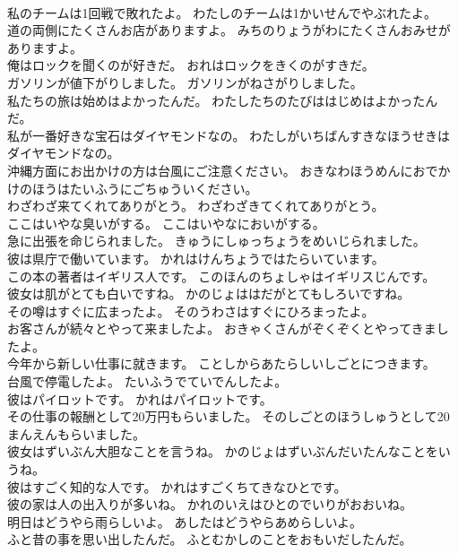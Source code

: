 \documentclass[8pt]{extreport}
\begin{document}
\begin{CJK}{UTF8}{min}
\\	私のチームは1回戦で敗れたよ。	わたしのチームは1かいせんでやぶれたよ。 
\\	道の両側にたくさんお店がありますよ。	みちのりょうがわにたくさんおみせがありますよ。 
\\	俺はロックを聞くのが好きだ。	おれはロックをきくのがすきだ。 
\\	ガソリンが値下がりしました。	ガソリンがねさがりしました。 
\\	私たちの旅は始めはよかったんだ。	わたしたちのたびははじめはよかったんだ。 
\\	私が一番好きな宝石はダイヤモンドなの。	わたしがいちばんすきなほうせきはダイヤモンドなの。 
\\	沖縄方面にお出かけの方は台風にご注意ください。	おきなわほうめんにおでかけのほうはたいふうにごちゅういください。 
\\	わざわざ来てくれてありがとう。	わざわざきてくれてありがとう。 
\\	ここはいやな臭いがする。	ここはいやなにおいがする。 
\\	急に出張を命じられました。	きゅうにしゅっちょうをめいじられました。 
\\	彼は県庁で働いています。	かれはけんちょうではたらいています。 
\\	この本の著者はイギリス人です。	このほんのちょしゃはイギリスじんです。 
\\	彼女は肌がとても白いですね。	かのじょははだがとてもしろいですね。 
\\	その噂はすぐに広まったよ。	そのうわさはすぐにひろまったよ。 
\\	お客さんが続々とやって来ましたよ。	おきゃくさんがぞくぞくとやってきましたよ。 
\\	今年から新しい仕事に就きます。	ことしからあたらしいしごとにつきます。 
\\	台風で停電したよ。	たいふうでていでんしたよ。 
\\	彼はパイロットです。	かれはパイロットです。 
\\	その仕事の報酬として20万円もらいました。	そのしごとのほうしゅうとして20まんえんもらいました。 
\\	彼女はずいぶん大胆なことを言うね。	かのじょはずいぶんだいたんなことをいうね。 
\\	彼はすごく知的な人です。	かれはすごくちてきなひとです。 
\\	彼の家は人の出入りが多いね。	かれのいえはひとのでいりがおおいね。 
\\	明日はどうやら雨らしいよ。	あしたはどうやらあめらしいよ。 
\\	ふと昔の事を思い出したんだ。	ふとむかしのことをおもいだしたんだ。 

\end{CJK}
\end{document}
